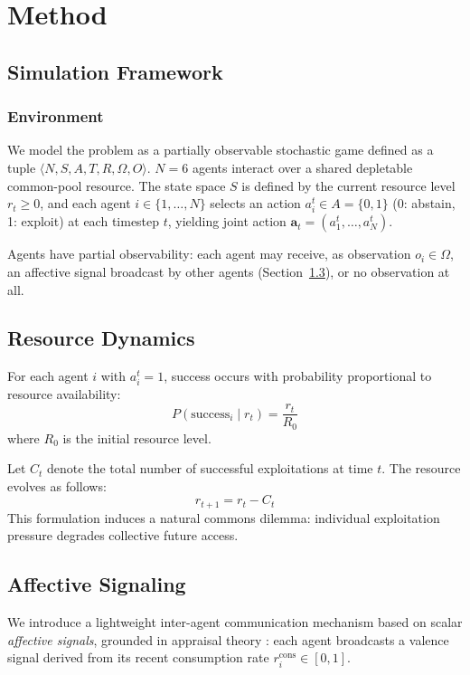\section{Method}
\subsection{Simulation Framework}
\subsubsection{Environment}

We model the problem as a partially observable stochastic game defined as a tuple
$\langle N, S, A, T, R, \Omega, O \rangle$.
$N = 6$ agents interact over a shared depletable common-pool resource.
The state space $S$ is defined by the current resource level $r_t \geq 0$,
and each agent $i \in \{1, \ldots, N\}$ selects an action
$a_i^t \in A = \{0, 1\}$ (0: abstain, 1: exploit) at each timestep $t$,
yielding joint action $\mathbf{a}_t = (a_1^t, \ldots, a_N^t)$.

Agents have partial observability: each agent may receive, as observation
$o_i \in \Omega$, an affective signal broadcast by other agents
(Section~\ref{sec:emotions}), or no observation at all.

\subsection{Resource Dynamics}

For each agent $i$ with $a_i^t = 1$,
success occurs with probability proportional to resource availability:
\begin{equation}
    P(\text{success}_i \mid r_t) = \frac{r_t}{R_0}
\end{equation}
where $R_0$ is the initial resource level.

Let $C_t$ denote the total number of successful exploitations at time $t$. The resource evolves as follows:
\begin{equation}
    r_{t+1} =  r_t - C_t
\end{equation}
This formulation induces a natural commons dilemma: individual exploitation pressure
degrades collective future access.

\subsection{Affective Signaling}
\label{sec:emotions}


We introduce a lightweight inter-agent communication mechanism based on
scalar \emph{affective signals}, grounded in appraisal theory
\cite{moorsPowerGoalDirectedProcesses2017}: each agent broadcasts a valence signal derived from its
recent consumption rate $r_i^{\text{cons}} \in [0,1]$.

